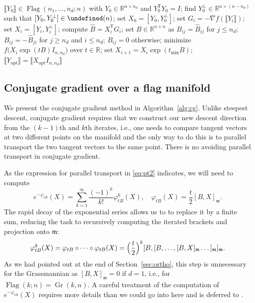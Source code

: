 \documentclass[11pt,reqno]{amsart}%
\theoremstyle{definition}
\theoremstyle{remark}
\newcommand{\tp}{{\scriptscriptstyle\mathsf{T}}}
\newcommand{\lb}{\llbracket}
\newcommand{\rb}{\rrbracket}
\let\O\undefined
\DeclareMathOperator{\Gr}{Gr}
\DeclareMathOperator{\Flag}{Flag}
\DeclareMathOperator{\O}{O}
\begin{document}
\begin{algorithm}
  \caption{Steepest descent in Stiefel coordinates}
  \label{alg:sd}
  \begin{algorithmic}[1]
    \Require $\lb Y_0 \rb \in \Flag(n_1,\dots,n_d;n)$ with $Y_0 \in \mathbb{R}^{n\times n_d}$ and $Y_0^\tp Y_0=I$;
    \State find $Y_0^{\perp} \in \mathbb{R}^{n \times (n-n_d)}$ such that $[Y_0,Y_0^\perp ] \in \O(n)$;
    \State set $X_{0} = [Y_0, Y_0^\perp ]$;
    \State set $G_{i} = -\nabla f(\lb Y_i \rb)$; \Comment{gradient at $\lb Y_{i} \rb$ as in \eqref{eq:gradient variable delta}}
    \State set $X_i = [Y_i, Y_i^\perp ]$;
    \State compute $\widehat{B} = X_{i}^\tp  G_{i}$;
    \State set $B \in \mathbb{R}^{n \times n}$ as $B_{ij} = \widehat{B}_{ij}$ for $j \leq n_d$;
    \State {} $B_{ij} = -\widehat{B}_{ji}$ for $j \geq n_d$ and $i \leq n_d$;
    \State {} $B_{ij} = 0$ otherwise;
    \State minimize $ f\bigl(X_{i} \exp(tB) I_{n,n_d}\bigr)$ over $t \in \mathbb{R}$; 
    \State set $X_{i+1} = X_{i} \exp(t_{\min}B)$;
    \EndFor       
    \Ensure $\lb Y_{\operatorname{opt}} \rb = \lb X_{\operatorname{opt}} I_{n,n_d} \rb$
  \end{algorithmic}
\end{algorithm}

\subsection{Conjugate gradient over a flag manifold}\label{sec:cg}

We present the conjugate gradient method in Algorithm~\ref{alg:cg}. Unlike steepest descent, conjugate gradient requires that we construct our new descent direction from the $(k-1)$th and
$k$th iterates, i.e., one needs to compare tangent vectors at two different points on the manifold and the only way to do this is to parallel transport the two tangent vectors to the same point. There is no avoiding parallel transport in conjugate gradient.

As the expression for parallel transport in \eqref{eq:pt2} indicates, we will need to compute
\[
e^{-\varphi_{tB}}(X) = \sum_{k=1}^{\infty} \frac{(-1)^k}{k!} \varphi_{tB}^k(X),\quad \varphi_{tB}(X) = \frac{t}{2}[B,X]_{\mathfrak{m}}.
\]
The rapid decay of the exponential series allows us to to replace it by a finite sum, reducing the task to recursively computing the iterated brackets and projection onto $\mathfrak{m}$:
\[
\varphi_{tB}^k(X) =\varphi_{tB} \circ \cdots \circ \varphi_{tB} (X)
= \Bigl(\frac{t}{2}\Bigr)^k [B, [ B,\dots,[B,X]_{\mathfrak{m}} \dots ]_{\mathfrak{m}}]_{\mathfrak{m}}.
\]
As we had pointed out at the end of Section~\ref{sec:ortho}, this step is unnecessary for the Grassmannian as $[B,X]_{\mathfrak{m}} = 0$ if $d= 1$, i.e., for $\Flag(k;n) = \Gr(k,n)$. A careful treatment of the computation of $e^{-\varphi_{tB}}(X) $ requires more details than we could go into here and is deferred to \cite{next}.
\end{document}
